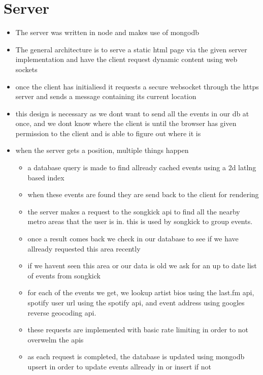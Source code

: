 \documentclass[10pt]{article}
\begin{document}
    \section{Server}
        \begin{itemize}
            \item The server was written in node and makes use of mongodb
            \item The general architecture is to serve a static html page via the given server implementation and have the client request dynamic content using web sockets
            \item once the client has initialiesd it requests a secure websocket through the https server and sends a message containing its current location
            \item this design is necessary as we dont want to send all the events in our db at once, and we dont know where the client is until the browser has given permission to the client and is able to figure out where it is
            \item when the server gets a position, multiple things happen
            \begin{itemize}
                \item a database query is made to find allready cached events using a 2d latlng based index
                \item when these events are found they are send back to the client for rendering

                \item the server makes a request to the songkick api to find all the nearby metro areas that the user is in. this is used by songkick to group events.
                \item once a result comes back we check in our database to see if we have allready requested this area recently
                \item if we havent seen this area or our data is old we ask for an up to date list of events from songkick
                \item for each of the events we get, we lookup artist bios using the last.fm api, spotify user url using the spotify api, and event address using googles reverse geocoding api.

                \item these requests are implemented with basic rate limiting in order to not overwelm the apis
                \item as each request is completed, the database is updated using mongodb upsert in order to update events allready in or insert if not
            \end{itemize}
        \end{itemize}
\end{document}
